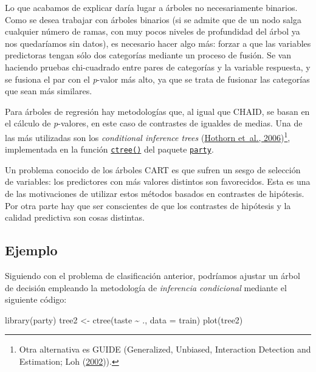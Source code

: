 \documentclass[
]{book}
\newenvironment{Shaded}{\begin{snugshade}}{\end{snugshade}}
\newcommand{\AttributeTok}[1]{\textcolor[rgb]{0.77,0.63,0.00}{#1}}
\newcommand{\FunctionTok}[1]{\textcolor[rgb]{0.00,0.00,0.00}{#1}}
\newcommand{\NormalTok}[1]{#1}
\newcommand{\OtherTok}[1]{\textcolor[rgb]{0.56,0.35,0.01}{#1}}
\newcommand{\SpecialCharTok}[1]{\textcolor[rgb]{0.00,0.00,0.00}{#1}}
\theoremstyle{break}
\theoremstyle{nonumberplain}
\begin{document}
Lo que acabamos de explicar daría lugar a árboles no necesariamente binarios.
Como se desea trabajar con árboles binarios (si se admite que de un nodo salga cualquier número de ramas, con muy pocos niveles de profundidad del árbol ya nos quedaríamos sin datos), es necesario hacer algo más: forzar a que las variables predictoras tengan sólo dos categorías mediante un proceso de fusión.
Se van haciendo pruebas chi-cuadrado entre pares de categorías y la variable respuesta, y se fusiona el par con el \emph{p}-valor más alto, ya que se trata de fusionar las categorías que sean más similares.

Para árboles de regresión hay metodologías que, al igual que CHAID, se basan en el cálculo de \emph{p}-valores, en este caso de contrastes de igualdes de medias.
Una de las más utilizadas son los \emph{conditional inference trees} (\protect\hyperlink{ref-hothorn2006unbiased}{Hothorn et~al., 2006})\footnote{Otra alternativa es GUIDE (Generalized, Unbiased, Interaction Detection and Estimation; Loh (\protect\hyperlink{ref-loh2002regression}{2002})).}, implementada en la función \href{https://rdrr.io/pkg/party/man/ctree.html}{\texttt{ctree()}} del paquete \href{https://CRAN.R-project.org/package=party}{\texttt{party}}.

Un problema conocido de los árboles CART es que sufren un sesgo de selección de variables: los predictores con más valores distintos son favorecidos.
Esta es una de las motivaciones de utilizar estos métodos basados en contrastes de hipótesis.
Por otra parte hay que ser conscientes de que los contrastes de hipótesis y la calidad predictiva son cosas distintas.

\hypertarget{ejemplo-1}{%
\subsection{Ejemplo}\label{ejemplo-1}}

Siguiendo con el problema de clasificación anterior, podríamos ajustar un árbol de decisión empleando la metodología de \emph{inferencia condicional} mediante el siguiente código:



\begin{Shaded}
\begin{Highlighting}[]
\FunctionTok{library}\NormalTok{(party)}
\NormalTok{tree2 }\OtherTok{\textless{}{-}} \FunctionTok{ctree}\NormalTok{(taste }\SpecialCharTok{\textasciitilde{}}\NormalTok{ ., }\AttributeTok{data =}\NormalTok{ train) }
\FunctionTok{plot}\NormalTok{(tree2)}
\end{Highlighting}
\end{Shaded}
\end{document}
